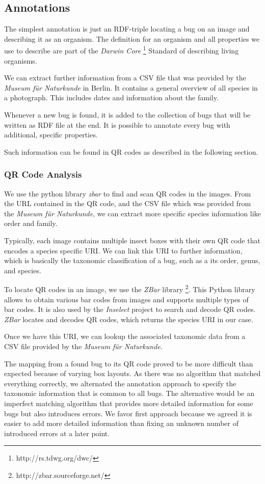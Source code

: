 \subsection{Annotations}
The simplest annotation is just an RDF-triple locating a bug on an image and describing it as an organism. 
The definition for an organism and all properties we use to describe are part of the \emph{Darwin Core} \footnote{http://rs.tdwg.org/dwc/} Standard of describing living organisms.

We can extract further information from a CSV file that was provided by the \emph{Museum für Naturkunde} in Berlin.
It contains a general overview of all species in a photograph.
This includes dates and information about the family.

Whenever a new bug is found, it is added to the collection of bugs that will be written as RDF file at the end.
It is possible to annotate every bug with additional, specific properties.

Such information can be found in QR codes as described in the following section.

\subsubsection{QR Code Analysis}
We use the python library \textit{zbar} to find and scan QR codes in the images.
From the URL contained in the QR code, and the CSV file which was provided from the \emph{Museum für Naturkunde}, we can extract more specific species information like order and family.

Typically, each image contains multiple insect boxes with their own QR code that encodes a species specific URI.
We can link this URI to further information, which is basically the taxonomic classification of a bug, such as a its order, genus, and species.

To locate QR codes in an image, we use the \emph{ZBar} library \footnote{http://zbar.sourceforge.net/}.
This Python library allows to obtain various bar codes from images and supports multiple types of bar codes.
It is also used by the \emph{Inselect} project to search and decode QR codes.
\emph{ZBar} locates and decodes QR codes, which returns the species URI in our case.

Once we have this URI, we can lookup the associated taxonomic data from a CSV file provided by the \emph{Museum für Naturkunde}.

The mapping from a found bug to its QR code proved to be more difficult than expected because of varying box layouts.
As there was no algorithm that matched everything correctly, we alternated the annotation approach to specify the taxonomic information that is common to all bugs.
The alternative would be an imperfect matching algorithm that  provides more detailed information for some bugs but also introduces errors.
We favor first approach because we agreed it is easier to add more detailed information than fixing an unknown number of introduced errors at a later point.


